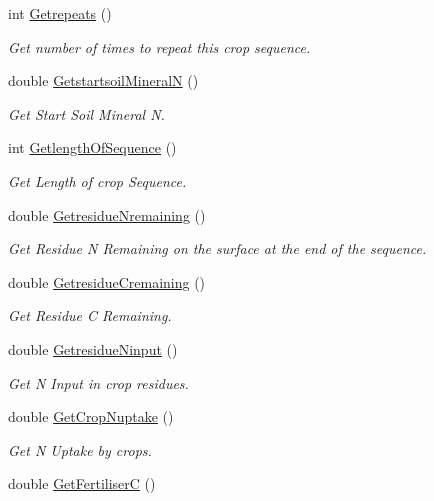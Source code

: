 \begin{DoxyCompactItemize}
int \mbox{\hyperlink{class_crop_sequence_class_a07ab6e17af1240ac95f3cbd4126eacc8}{Getrepeats}} ()
\begin{DoxyCompactList}\small\item\em Get number of times to repeat this crop sequence. \end{DoxyCompactList}\item 
double \mbox{\hyperlink{class_crop_sequence_class_aa75e7190f9466903705719d46718786b}{Getstartsoil\+MineralN}} ()
\begin{DoxyCompactList}\small\item\em Get Start Soil Mineral N. \end{DoxyCompactList}\item 
int \mbox{\hyperlink{class_crop_sequence_class_aab561714ad5498801165de8087d24d16}{Getlength\+Of\+Sequence}} ()
\begin{DoxyCompactList}\small\item\em Get Length of crop Sequence. \end{DoxyCompactList}\item 
double \mbox{\hyperlink{class_crop_sequence_class_a27436b7d13bd24370f86e6d684ca2de4}{Getresidue\+Nremaining}} ()
\begin{DoxyCompactList}\small\item\em Get Residue N Remaining on the surface at the end of the sequence. \end{DoxyCompactList}\item 
double \mbox{\hyperlink{class_crop_sequence_class_a387a4ec45e99e4110fc538908a6d2bb9}{Getresidue\+Cremaining}} ()
\begin{DoxyCompactList}\small\item\em Get Residue C Remaining. \end{DoxyCompactList}\item 
double \mbox{\hyperlink{class_crop_sequence_class_a68765f1adc5627b9c44f53c38d3620d3}{Getresidue\+Ninput}} ()
\begin{DoxyCompactList}\small\item\em Get N Input in crop residues. \end{DoxyCompactList}\item 
double \mbox{\hyperlink{class_crop_sequence_class_a92d2f8335cb4f16506d5087e0ab58622}{Get\+Crop\+Nuptake}} ()
\begin{DoxyCompactList}\small\item\em Get N Uptake by crops. \end{DoxyCompactList}\item 
double \mbox{\hyperlink{class_crop_sequence_class_a2e02c66c8af9fcd82010a21360fb1553}{Get\+FertiliserC}} ()

\end{DoxyCompactItemize}
